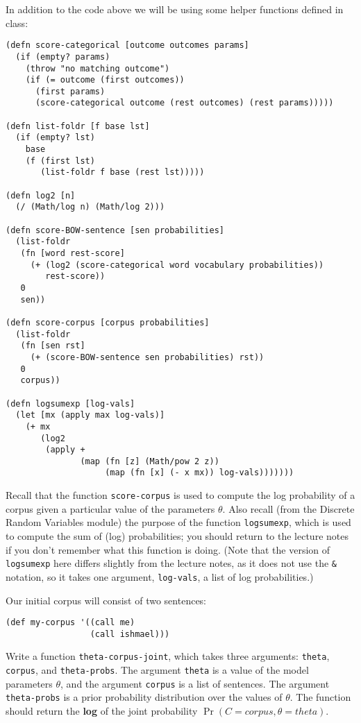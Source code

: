 \documentclass[10pt]{article}
\begin{document}
In addition to the code above we will be using some helper functions defined in class:

\begin{lstlisting}
(defn score-categorical [outcome outcomes params]
  (if (empty? params)
    (throw "no matching outcome")
    (if (= outcome (first outcomes))
      (first params)
      (score-categorical outcome (rest outcomes) (rest params)))))

(defn list-foldr [f base lst]
  (if (empty? lst)
    base
    (f (first lst)
       (list-foldr f base (rest lst)))))

(defn log2 [n]
  (/ (Math/log n) (Math/log 2)))

(defn score-BOW-sentence [sen probabilities]
  (list-foldr
   (fn [word rest-score]
     (+ (log2 (score-categorical word vocabulary probabilities))
        rest-score))
   0
   sen))

(defn score-corpus [corpus probabilities]
  (list-foldr
   (fn [sen rst]
     (+ (score-BOW-sentence sen probabilities) rst))
   0
   corpus))

(defn logsumexp [log-vals]
  (let [mx (apply max log-vals)]
    (+ mx
       (log2
        (apply +
               (map (fn [z] (Math/pow 2 z))
                    (map (fn [x] (- x mx)) log-vals)))))))
\end{lstlisting}

Recall that the function \texttt{score-corpus} is used to compute the
log probability of a corpus given a particular value of the parameters
$\theta$. Also recall (from the Discrete Random Variables module) the
purpose of the function \texttt{logsumexp}, which is used to compute
the sum of (log) probabilities; you should return to the lecture notes
if you don't remember what this function is doing. (Note that the
version of \texttt{logsumexp} here differs slightly from the lecture
notes, as it does not use the \texttt{\&} notation, so it takes one
argument, \texttt{log-vals}, a list of log probabilities.)

Our initial corpus will consist of two sentences:

\begin{lstlisting}
(def my-corpus '((call me)
                 (call ishmael)))
\end{lstlisting}

Write a function \texttt{theta-corpus-joint}, which takes three
arguments: \texttt{theta}, \texttt{corpus}, and
\texttt{theta-probs}. The argument \texttt{theta} is a value of the
model parameters $\theta$, and the argument \texttt{corpus} is a list
of sentences. The argument \texttt{theta-probs} is a prior probability
distribution over the values of $\theta$. The function should return
the \textbf{log} of the joint probability
$\Pr(C=corpus,\theta=theta)$.
\end{document}
